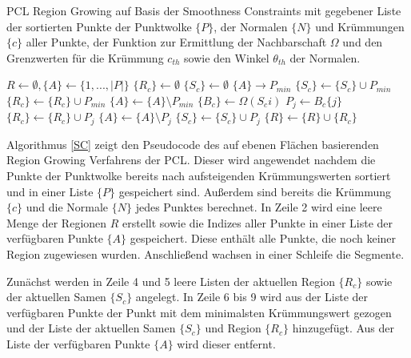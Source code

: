 \begin{algorithm}
	\caption{PCL Region Growing auf Basis der Smoothness Constraints mit gegebener Liste der sortierten Punkte der Punktwolke $ \{P\} $, der Normalen $ \{N\} $ und Krümmungen $ \{c\} $ aller Punkte, der Funktion zur Ermittlung der Nachbarschaft $ \Omega $ und den Grenzwerten für die Krümmung $ c_{th} $ sowie den Winkel $ \theta_{th} $ der Normalen.}
	\label{SC}
	\begin{algorithmic}[1]
			\State $ R \leftarrow \emptyset, \{A\} \leftarrow \{1,...,\vert P \vert \} $
				\State $ \{R_c\} \leftarrow \emptyset $
				\State $ \{S_c\} \leftarrow \emptyset $
				\State $ \{A\} \rightarrow P_{min} $
				\State $ \{S_c\} \leftarrow \{S_c\} \cup P_{min} $
				\State $ \{R_c\} \leftarrow \{R_c\} \cup P_{min} $
				\State $ \{A\} \leftarrow \{A\} \setminus P_{min} $
					\State $ \{B_c\} \leftarrow \Omega(S_c{i}) $
						\State $ P_j \leftarrow B_c\{j\} $
							\State $ \{R_c\} \leftarrow \{R_c\} \cup P_j $
							\State $ \{A\} \leftarrow \{A\} \setminus P_j $
								\State $ \{S_c\} \leftarrow \{S_c\} \cup P_j $
							\EndIf
						\EndIf
					\EndFor
				\EndFor
				\State $ \{R\} \leftarrow \{R\} \cup \{R_c\} $
			\EndWhile
			\State {}
		\EndFunction
	\end{algorithmic}
\end{algorithm}

Algorithmus \ref{SC} zeigt den Pseudocode des auf ebenen Flächen basierenden Region Growing Verfahrens der PCL. Dieser wird angewendet nachdem die Punkte der Punkt\-wol\-ke bereits nach aufsteigenden Krümmungswerten sortiert und in einer Liste $ \{P\} $ gespeichert sind. Außerdem sind bereits die Krümmung $ \{c\} $ und die Normale $ \{N\} $ jedes Punktes berechnet. In Zeile 2 wird eine leere Menge der Regionen $ R $ erstellt sowie die Indizes aller Punkte in einer Liste der verfügbaren Punkte $ \{A\} $ gespeichert. Diese enthält alle Punkte, die noch keiner Region zugewiesen wurden. Anschließend wachsen in einer Schleife die Segmente. 

Zunächst werden in Zeile 4 und 5 leere Listen der aktuellen Region $ \{R_c\} $ sowie der aktuellen Samen $ \{S_c\} $ angelegt. In Zeile 6 bis 9  wird aus der Liste der verfügbaren Punkte der Punkt mit dem minimalsten Krümmungswert gezogen und der Liste der aktuellen Samen $ \{S_c\} $ und Region $ \{R_c\} $ hinzugefügt. Aus der Liste der verfügbaren Punkte $ \{A\} $ wird dieser entfernt. 

